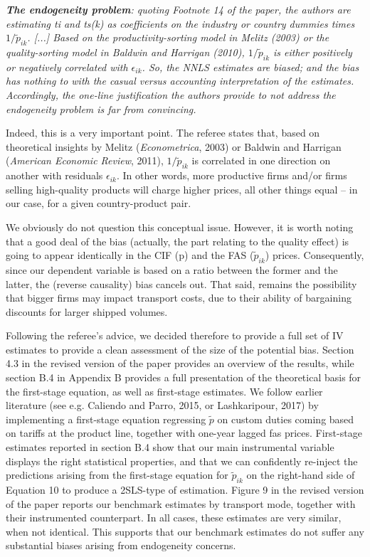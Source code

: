 \documentclass[a4paper,12pt]{article}
\begin{document}
\textit{\textbf{The endogeneity problem}: quoting Footnote 14 of the paper, the authors
are estimating ti and ts(k) as coefficients on the industry or country
dummies times $1/\widetilde{p}_{ik}$. [...] Based on the productivity-sorting model in Melitz (2003) or the quality-sorting
model in Baldwin and Harrigan (2010),  $1/\widetilde{p}_{ik}$ is either positively
or negatively correlated with $\epsilon_{ik}$. So, the NNLS estimates are biased; and
the bias has nothing to with the casual versus accounting interpretation of
the estimates. Accordingly, the one-line justification the authors provide
to not address the endogeneity problem is far from convincing.}

Indeed, this is a very important point. The referee states that, based on theoretical insights by Melitz (\emph{Econometrica}, 2003) or Baldwin and Harrigan (\emph{American Economic Review}, 2011), $1/\widetilde{p}_{ik}$ is correlated in one direction on another with residuals $\epsilon_{ik}$. In other words, more productive firms and/or firms selling high-quality products will charge higher prices, all other things equal – in our case, for a given country-product pair.

We obviously do not question this conceptual issue. However, it is worth noting that a good deal of the bias (actually, the part relating to the quality effect) is going to appear identically in the CIF (p) and the FAS ($\widetilde{p}_{ik}$) prices. Consequently, since our dependent variable is based on a ratio between the former and the latter, the (reverse causality) bias cancels out. That said, remains the possibility that bigger firms may impact transport costs, due to their ability of bargaining discounts for larger shipped volumes.

Following the referee's advice, we decided therefore to provide a full set of IV estimates to provide a clean assessment of the size of the potential bias. Section 4.3 in the revised version of the paper provides an overview of the results, while section B.4 in Appendix B provides a full presentation of the theoretical basis for the first-stage equation, as well as first-stage estimates. We follow earlier literature (see e.g. Caliendo and Parro, 2015, or Lashkaripour, 2017) by implementing a first-stage equation regressing $\widetilde{p}$ on custom duties coming based on tariffs at the product line, together with one-year lagged fas prices. First-stage estimates reported in section B.4 show that our main instrumental variable displays the right statistical properties, and that we can confidently re-inject the predictions arising from the first-stage equation for $\widetilde{p}_{ik}$ on the right-hand side of Equation 10 to produce a 2SLS-type of estimation. Figure 9 in the revised version of the paper reports our benchmark estimates by transport mode, together with their instrumented counterpart. In all cases, these estimates are very similar, when not identical. This supports that our benchmark estimates do not suffer any substantial biases arising from endogeneity concerns.
\end{document}
